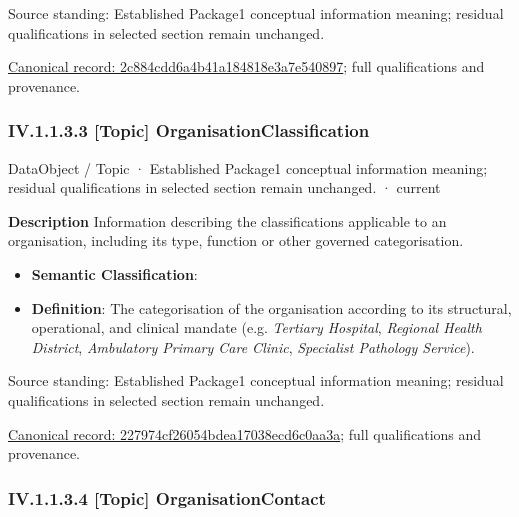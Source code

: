 Source standing: Established Package1 conceptual information meaning; residual qualifications in selected section remain unchanged.


{\footnotesize \href{../../../../../../../continuum/application/data-object/topic/2c884cdd6a4b41a184818e3a7e540897.md}{Canonical record: 2c884cdd6a4b41a184818e3a7e540897}; full qualifications and provenance.}\par
\subsubsection*{IV.1.1.3.3 [Topic] OrganisationClassification}
\label{navigation:IV.1.1.3.3}

\label{element:227974cf26054bdea17038ecd6c0aa3a}
{\small DataObject / Topic · Established Package1 conceptual information meaning; residual qualifications in selected section remain unchanged. · current}\par

\textbf{Description}
Information describing the classifications applicable to an organisation, including its type, function or other governed categorisation.



\begin{itemize}


\item \textbf{Semantic Classification}: \texttt{}

\item \textbf{Definition}: The categorisation of the organisation according to its structural, operational, and clinical mandate (e.g. \emph{Tertiary Hospital}, \emph{Regional Health District}, \emph{Ambulatory Primary Care Clinic}, \emph{Specialist Pathology Service}).

\end{itemize}


Source standing: Established Package1 conceptual information meaning; residual qualifications in selected section remain unchanged.


{\footnotesize \href{../../../../../../../continuum/application/data-object/topic/227974cf26054bdea17038ecd6c0aa3a.md}{Canonical record: 227974cf26054bdea17038ecd6c0aa3a}; full qualifications and provenance.}\par
\subsubsection*{IV.1.1.3.4 [Topic] OrganisationContact}
\label{navigation:IV.1.1.3.4}

